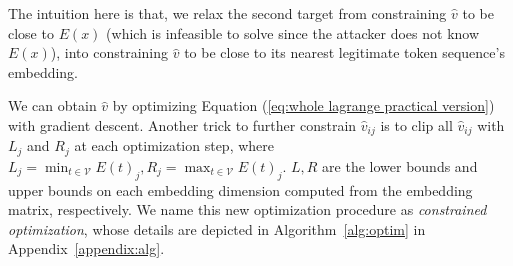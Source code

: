 The intuition here is that, we relax the second target from constraining $\hat{v}$ to be close to $E(x)$ (which is infeasible to solve since the attacker does not know $E(x)$), into constraining $\hat{v}$ to be close to its nearest legitimate token sequence's embedding.


We can obtain $\hat{v}$ by optimizing Equation (\ref{eq:whole lagrange practical version}) with gradient descent. Another trick to further constrain $\hat{v}_{ij}$ is to  clip all $\hat{v}_{ij}$ with $L_j$ and $R_j$  at each optimization step, where $L_j=\min_{t \in \mathcal{V}} E(t)_j, R_j=\max_{t \in \mathcal{V}} E(t)_j$. $L,R$ are the lower bounds and upper bounds on each embedding dimension computed from the embedding matrix, respectively. We name this new optimization procedure as \textit{constrained optimization}, whose details are depicted in Algorithm~\ref{alg:optim} in Appendix~\ref{appendix:alg}.






